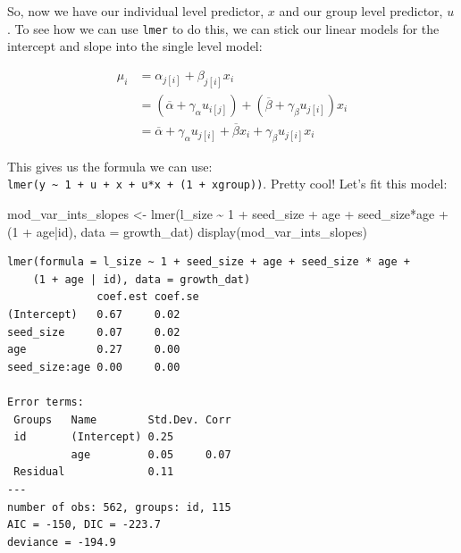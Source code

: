 \documentclass[
  letterpaper,
  DIV=11,
  numbers=noendperiod]{scrartcl}
\newenvironment{Shaded}{\begin{snugshade}}{\end{snugshade}}
\newcommand{\AttributeTok}[1]{\textcolor[rgb]{0.40,0.45,0.13}{#1}}
\newcommand{\DecValTok}[1]{\textcolor[rgb]{0.68,0.00,0.00}{#1}}
\newcommand{\FunctionTok}[1]{\textcolor[rgb]{0.28,0.35,0.67}{#1}}
\newcommand{\NormalTok}[1]{\textcolor[rgb]{0.00,0.23,0.31}{#1}}
\newcommand{\OtherTok}[1]{\textcolor[rgb]{0.00,0.23,0.31}{#1}}
\newcommand{\SpecialCharTok}[1]{\textcolor[rgb]{0.37,0.37,0.37}{#1}}
\begin{document}
So, now we have our individual level predictor, \(x\) and our group
level predictor, \(u\). To see how we can use \texttt{lmer} to do this,
we can stick our linear models for the intercept and slope into the
single level model:

\[
\begin{align*}
\mu_i &= \alpha_{j[i]} + \beta_{j[i]} x_i\\
&= (\overline{\alpha} + \gamma_{\alpha} u_{i[j]}) + (\overline{\beta} + \gamma_{\beta} u_{j[i]}) x_i\\
&= \overline{\alpha} + \gamma_{\alpha} u_{j[i]} + \overline{\beta} x_i + \gamma_{\beta} u_{j[i]}x_i
\end{align*}
\]

This gives us the formula we can use:
\texttt{lmer(y\ \textasciitilde{}\ 1\ +\ u\ +\ x\ +\ u*x\ +\ (1\ +\ x\textbar{}group))}.
Pretty cool! Let's fit this model:

\begin{Shaded}
\begin{Highlighting}[]
\NormalTok{mod\_var\_ints\_slopes }\OtherTok{\textless{}{-}} \FunctionTok{lmer}\NormalTok{(l\_size }\SpecialCharTok{\textasciitilde{}} \DecValTok{1} \SpecialCharTok{+}\NormalTok{ seed\_size }\SpecialCharTok{+}\NormalTok{ age }\SpecialCharTok{+}\NormalTok{ seed\_size}\SpecialCharTok{*}\NormalTok{age }\SpecialCharTok{+}\NormalTok{ (}\DecValTok{1} \SpecialCharTok{+}\NormalTok{ age}\SpecialCharTok{|}\NormalTok{id), }\AttributeTok{data =}\NormalTok{ growth\_dat)}
\FunctionTok{display}\NormalTok{(mod\_var\_ints\_slopes)}
\end{Highlighting}
\end{Shaded}

\begin{verbatim}
lmer(formula = l_size ~ 1 + seed_size + age + seed_size * age + 
    (1 + age | id), data = growth_dat)
              coef.est coef.se
(Intercept)   0.67     0.02   
seed_size     0.07     0.02   
age           0.27     0.00   
seed_size:age 0.00     0.00   

Error terms:
 Groups   Name        Std.Dev. Corr 
 id       (Intercept) 0.25          
          age         0.05     0.07 
 Residual             0.11          
---
number of obs: 562, groups: id, 115
AIC = -150, DIC = -223.7
deviance = -194.9 
\end{verbatim}
\end{document}

